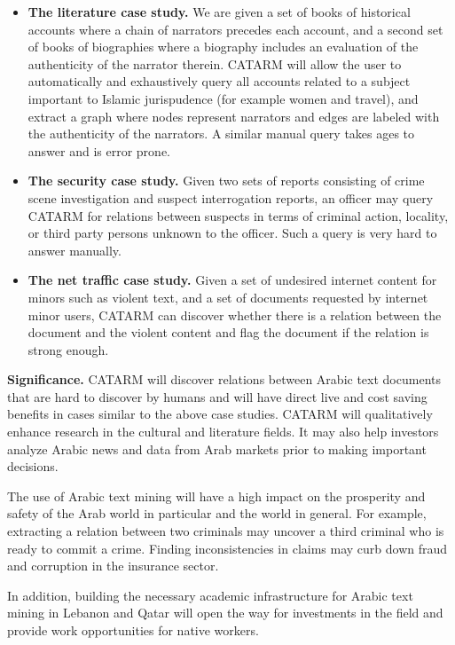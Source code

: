 \documentclass[12pt]{article}
\begin{document}
\begin{itemize}\itemsep0pt
\item {\bf The literature case study.}
We are given a set of books of historical accounts where
a chain of narrators precedes each account,
and a second set of books of biographies where
a biography includes an evaluation of the authenticity 
of the narrator therein.
CATARM will allow the user to automatically and exhaustively query 
all accounts related to a subject important to Islamic jurispudence 
(for example women and travel),
and extract a graph where nodes represent narrators and edges
are labeled with the authenticity of the narrators. 
A similar manual query takes ages to answer and is error prone.
\item {\bf The security case study.}
Given two sets of reports consisting of crime scene investigation 
and suspect interrogation reports, 
an officer may query CATARM 
for relations between suspects in terms of 
criminal action, locality, or third party persons unknown to the 
officer.
Such a query is very hard to answer manually.
\item {\bf The net traffic case study.}
Given a set of undesired internet content for minors
such as violent text, and a set of documents requested by internet
minor users, 
CATARM can discover whether there is a relation between 
the document and the violent content and flag the document if the
relation is strong enough. 
\end{itemize}

 
{\bf Significance.} 
CATARM will discover relations between Arabic text documents that 
are hard to discover by humans and will have direct live and
cost saving benefits in cases similar to the above case studies. 
CATARM will qualitatively enhance research in the cultural and 
literature fields. 
It may also help investors analyze Arabic news and data from Arab 
markets prior to making important decisions.

The use of Arabic text mining  will 
have a high impact on the prosperity and safety of the Arab world 
in particular and the world in general.
For example, extracting a relation between two criminals may 
uncover a third criminal who is ready to commit a crime.
Finding inconsistencies in claims may curb down fraud and corruption 
in the insurance sector.

In addition, building the necessary academic 
infrastructure for Arabic text mining in Lebanon and Qatar will 
open the way for investments in the field and provide work 
opportunities for native workers.
\end{document}
